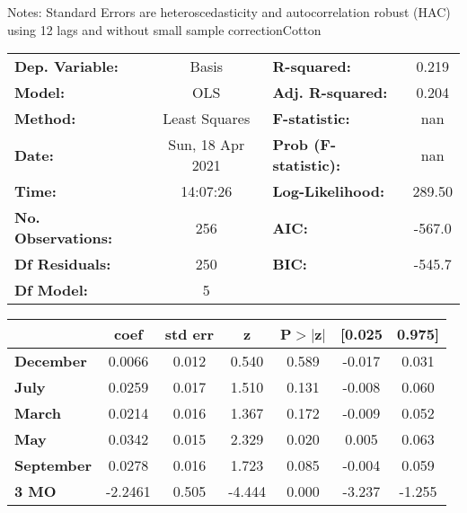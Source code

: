 Notes: \newline
 [1] Standard Errors are heteroscedasticity and autocorrelation robust (HAC) using 12 lags and without small sample correctionCotton\begin{center}
\begin{tabular}{lclc}
\toprule
\textbf{Dep. Variable:}    &      Basis       & \textbf{  R-squared:         } &     0.219   \\
\textbf{Model:}            &       OLS        & \textbf{  Adj. R-squared:    } &     0.204   \\
\textbf{Method:}           &  Least Squares   & \textbf{  F-statistic:       } &       nan   \\
\textbf{Date:}             & Sun, 18 Apr 2021 & \textbf{  Prob (F-statistic):} &      nan    \\
\textbf{Time:}             &     14:07:26     & \textbf{  Log-Likelihood:    } &    289.50   \\
\textbf{No. Observations:} &         256      & \textbf{  AIC:               } &    -567.0   \\
\textbf{Df Residuals:}     &         250      & \textbf{  BIC:               } &    -545.7   \\
\textbf{Df Model:}         &           5      & \textbf{                     } &             \\
\bottomrule
\end{tabular}
\begin{tabular}{lcccccc}
                   & \textbf{coef} & \textbf{std err} & \textbf{z} & \textbf{P$> |$z$|$} & \textbf{[0.025} & \textbf{0.975]}  \\
\midrule
\textbf{December}  &       0.0066  &        0.012     &     0.540  &         0.589        &       -0.017    &        0.031     \\
\textbf{July}      &       0.0259  &        0.017     &     1.510  &         0.131        &       -0.008    &        0.060     \\
\textbf{March}     &       0.0214  &        0.016     &     1.367  &         0.172        &       -0.009    &        0.052     \\
\textbf{May}       &       0.0342  &        0.015     &     2.329  &         0.020        &        0.005    &        0.063     \\
\textbf{September} &       0.0278  &        0.016     &     1.723  &         0.085        &       -0.004    &        0.059     \\
\textbf{3 MO}      &      -2.2461  &        0.505     &    -4.444  &         0.000        &       -3.237    &       -1.255     \\

\end{tabular}
\end{center}
